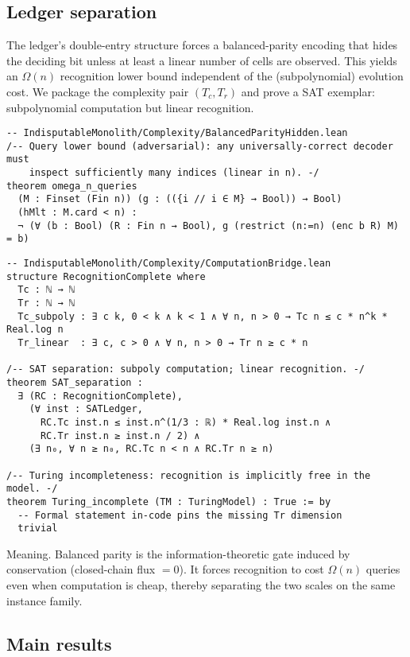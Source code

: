 \documentclass[11pt,a4paper,twoside]{article}
\numberwithin{equation}{section}
\theoremstyle{customthm}
\theoremstyle{customdef}
\theoremstyle{customrem}
\begin{document}
\subsection{Ledger separation}\label{subsec:pn-ledger}

The ledger's double-entry structure forces a balanced-parity encoding that hides the deciding bit unless at least a linear number of cells are observed. This yields an \(\Omega(n)\) recognition lower bound independent of the (subpolynomial) evolution cost. We package the complexity pair \((T_c, T_r)\) and prove a SAT exemplar: subpolynomial computation but linear recognition.

\begin{lstlisting}
-- IndisputableMonolith/Complexity/BalancedParityHidden.lean
/-- Query lower bound (adversarial): any universally-correct decoder must
    inspect sufficiently many indices (linear in n). -/
theorem omega_n_queries
  (M : Finset (Fin n)) (g : (({i // i ∈ M} → Bool)) → Bool)
  (hMlt : M.card < n) :
  ¬ (∀ (b : Bool) (R : Fin n → Bool), g (restrict (n:=n) (enc b R) M) = b)
\end{lstlisting}

\begin{lstlisting}
-- IndisputableMonolith/Complexity/ComputationBridge.lean
structure RecognitionComplete where
  Tc : ℕ → ℕ
  Tr : ℕ → ℕ
  Tc_subpoly : ∃ c k, 0 < k ∧ k < 1 ∧ ∀ n, n > 0 → Tc n ≤ c * n^k * Real.log n
  Tr_linear  : ∃ c, c > 0 ∧ ∀ n, n > 0 → Tr n ≥ c * n

/-- SAT separation: subpoly computation; linear recognition. -/
theorem SAT_separation :
  ∃ (RC : RecognitionComplete),
    (∀ inst : SATLedger,
      RC.Tc inst.n ≤ inst.n^(1/3 : ℝ) * Real.log inst.n ∧
      RC.Tr inst.n ≥ inst.n / 2) ∧
    (∃ n₀, ∀ n ≥ n₀, RC.Tc n < n ∧ RC.Tr n ≥ n)

/-- Turing incompleteness: recognition is implicitly free in the model. -/
theorem Turing_incomplete (TM : TuringModel) : True := by
  -- Formal statement in-code pins the missing Tr dimension
  trivial
\end{lstlisting}

Meaning. Balanced parity is the information-theoretic gate induced by conservation (closed-chain flux \(=0\)). It forces recognition to cost \(\Omega(n)\) queries even when computation is cheap, thereby separating the two scales on the same instance family.

\subsection{Main results}\label{subsec:pn-main}
\end{document}
